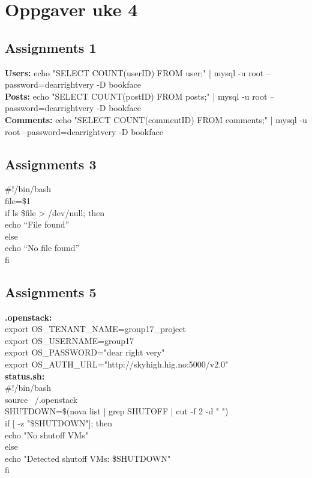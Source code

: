 \section{Oppgaver uke 4}

\subsection{Assignments 1} 
\textbf{Users:} echo "SELECT COUNT(userID) FROM user;" | mysql -u root --password=dearrightvery -D bookface\\
\textbf{Posts:} echo "SELECT COUNT(postID) FROM posts;" | mysql -u root --password=dearrightvery -D bookface\\
\textbf{Comments:} echo "SELECT COUNT(commentID) FROM comments;" | mysql -u root --password=dearrightvery -D bookface\\

\subsection{Assignments 3} 
\#!/bin/bash\\
file=\$1\\
if ls \$file > /dev/null; then\\
echo “File found”\\
else\\
echo “No file found”\\
fi\\


\subsection{Assignments 5} 
\textbf{.openstack:}\\
export OS\_TENANT\_NAME=group17\_project \\
export OS\_USERNAME=group17 \\
export OS\_PASSWORD="dear right very" \\
export OS\_AUTH\_URL="http://skyhigh.hig.no:5000/v2.0" \\

\textbf{status.sh:}\\
\#!/bin/bash \\

source ~/.openstack \\

SHUTDOWN=\$(nova list | grep SHUTOFF | cut -f 2 -d " ") \\
if [ -z "\$SHUTDOWN"]; then \\
echo "No shutoff VMs" \\
else\\
echo "Detected shutoff VMs: \$SHUTDOWN"\\
fi\\

